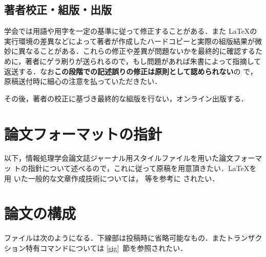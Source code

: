 \documentclass[submit,techrep,noauthor]{ipsj}
\begin{document}
\subsection{著者校正・組版・出版}

学会では用語や用字を一定の基準に従って修正することがある．また \LaTeX の
実行環境の差異などによって著者が作成したハードコピーと実際の組版結果が微
妙に異なることがある．これらの修正や差異が問題ないかを最終的に確認するた
めに，著者にゲラ刷りが送られるので，もし問題があれば朱書によって指摘して
返送する．なお{\bf この段階での記述誤りの修正は原則として認められない}の
で，原稿送付時に細心の注意を払っていただきたい．

その後，著者の校正に基づき最終的な組版を行ない，オンライン出版する．



\section{論文フォーマットの指針}
\label{sec:format}

以下，情報処理学会論文誌ジャーナル用スタイルファイルを用いた論文フォーマッ
トの指針について述べるので，これに従って原稿を用意頂きたい．\LaTeX を用
いた一般的な文章作成技術については，\cite{okumura, companion} 等を参考に
されたい．

\section{論文の構成}
\label{config}

ファイルは次のようになる．下線部は投稿時に省略可能なもの．またトランザク
ション特有コマンドについては \ref{sig}~節を参照されたい．
\end{document}

